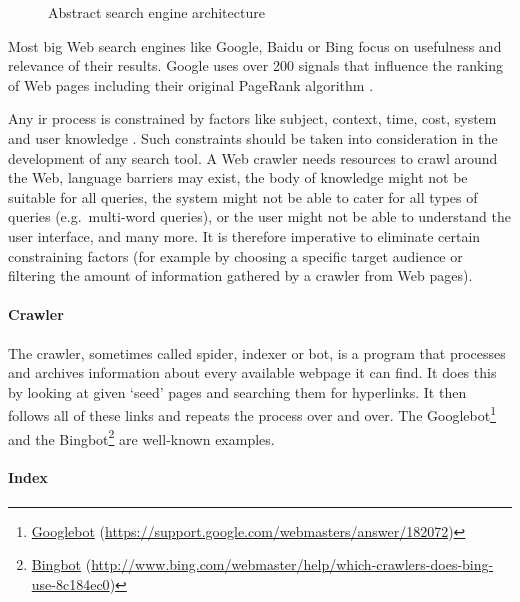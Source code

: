 \begin{figure}[htbp]
  \centering
  
  \caption[Search Engine Architecture]{Abstract search engine architecture}
\label{fig:SEA}
\end{figure}

Most big Web search engines like Google, Baidu or Bing focus on usefulness and relevance of their results.\autocite{Google2012, Baidu2012, Microsoft2012a} Google uses over 200 signals \autocite{Google2012} that influence the ranking of Web pages including their original PageRank algorithm \autocite{Brin1998, Brin1998b}.

Any \gls{ir} process is constrained by factors like subject, context, time, cost, system and user knowledge \autocite{Marchionini1988}. Such constraints should be taken into consideration in the development of any search tool. A Web crawler needs resources to crawl around the Web, language barriers may exist, the body of knowledge might not be suitable for all queries, the system might not be able to cater for all types of queries (e.g.\ multi-word queries), or the user might not be able to understand the user interface, and many more. It is therefore imperative to eliminate certain constraining factors (for example by choosing a specific target audience or filtering the amount of information gathered by a crawler from Web pages).


\paragraph{Crawler}

The crawler, sometimes called spider, indexer or bot, is a program that processes and archives information about every available webpage it can find. It does this by looking at given `seed' pages and searching them for hyperlinks. It then follows all of these links and repeats the process over and over. The Googlebot\footnote{\href{https://support.google.com/webmasters/answer/182072}{Googlebot} (\url{https://support.google.com/webmasters/answer/182072})} and the Bingbot\footnote{\href{http://www.bing.com/webmaster/help/which-crawlers-does-bing-use-8c184ec0}{Bingbot} (\url{http://www.bing.com/webmaster/help/which-crawlers-does-bing-use-8c184ec0})} are well-known examples.


\paragraph{Index}

